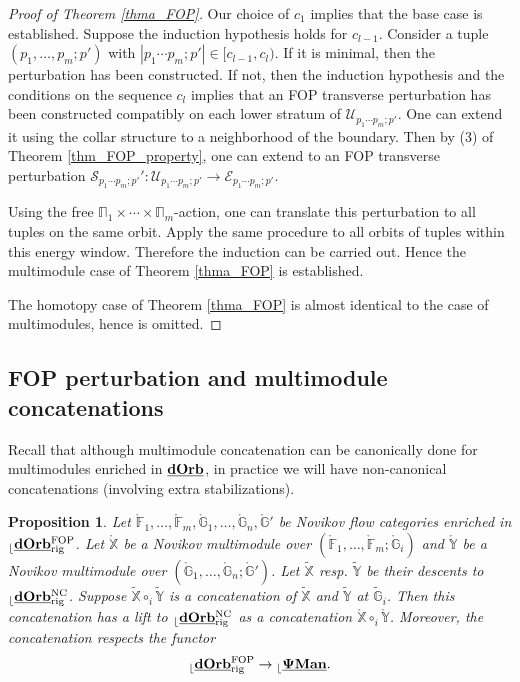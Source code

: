 \documentclass[reqno, 10pt]{amsart}
\numberwithin{equation}{section}
\numberwithin{equation}{section}
\newtheorem{prop}[thm]{Proposition}
\theoremstyle{definition}
\theoremstyle{remark}
\newcommand{\beqn}{\begin{equation*}}
\newcommand{\eeqn}{\end{equation*}}
\newcommand{\mb}{\mathbb}
\newcommand{\mc}{\mathcal}
\renewcommand{\outer}{{}_{\lfloor}}
\newcommand{\pman}{\uds{{\bf \Psi}{\bf Man}}}
\newcommand{\uds}[1]{\underline{\smash{#1}}}
\begin{document}
\begin{proof}[Proof of Theorem \ref{thma_FOP}]
Our choice of $c_1$ implies that the base case is established. Suppose the induction hypothesis holds for $c_{l-1}$. Consider a tuple $(p_1, \ldots, p_m;p')$ with $|p_1 \cdots p_m; p'| \in [c_{l-1}, c_l)$. If it is minimal, then the perturbation has been constructed. If not, then the induction hypothesis and the conditions on the sequence $c_l$ implies that an FOP transverse perturbation has been constructed compatibly on each lower stratum of ${\mc U}_{p_1\cdots p_m; p'}$. One can extend it using the collar structure to a neighborhood of the boundary. Then by (3) of Theorem \ref{thm_FOP_property}, one can extend to an FOP transverse perturbation ${\mc S}_{p_1\cdots p_m; p'}': {\mc U}_{p_1 \cdots p_m; p'}\to {\mc E}_{p_1\cdots p_m; p'}$.

Using the free $\mb\Pi_1\times \cdots \times \mb\Pi_m$-action, one can translate this perturbation to all tuples on the same orbit. Apply the same procedure to all orbits of tuples within this energy window. Therefore the induction can be carried out. Hence the multimodule case of Theorem \ref{thma_FOP} is established. 

The homotopy case of Theorem \ref{thma_FOP} is almost identical to the case of multimodules, hence is omitted.


\end{proof}








\subsection{FOP perturbation and multimodule concatenations}

Recall that although multimodule concatenation can be canonically done for multimodules enriched in $\uds{\bf dOrb}$, in practice we will have non-canonical concatenations (involving extra stabilizations). 


\begin{prop}\label{prop_FOP_concatenation}
Let $\mathring {\mb F}_1, \ldots, \mathring {\mb F}_m, \mathring {\mb G}_1, \ldots, \mathring {\mb G}_n, \mathring {\mb G}'$ be Novikov flow categories enriched in $\outer \uds{\bf dOrb}_{\rm rig}^{\rm FOP}$. Let $\mathring {\mb X}$ be a Novikov multimodule over $(\mathring {\mb F}_1, \ldots, \mathring {\mb F}_m; \mathring {\mb G}_i)$ and $\mathring {\mb Y}$ be a Novikov multimodule over $(\mathring {\mb G}_1, \ldots, \mathring {\mb G}_n; \mathring {\mb G}')$. Let $\tilde {\mb X}$ resp. $\tilde {\mb Y}$ be their descents to $\outer \uds{\bf dOrb}_{\rm rig}^{\rm NC}$. Suppose $\tilde {\mb X} \circ_i \tilde {\mb Y}$ is a concatenation of $\tilde {\mb X}$ and $\tilde {\mb Y}$ at $\tilde {\mb G}_i$. Then this concatenation has a lift to $\outer \uds{\bf dOrb}_{\rm rig}^{\rm NC}$ as a concatenation $\mathring {\mb X} \circ_i \mathring {\mb Y}$. Moreover, the concatenation respects the functor
\beqn
\outer \uds{\bf dOrb}_{\rm rig}^{\rm FOP} \to \outer \pman.
\eeqn
\end{prop}
\end{document}
